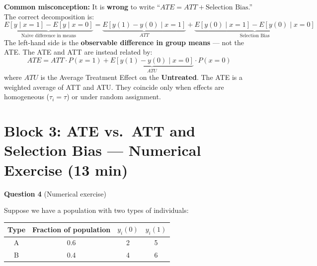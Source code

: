 \documentclass[11pt,a4paper]{article}
\begin{document}
\begin{enumerate}[label=(\alph*)]
\begin{solution}
\medskip
\textbf{Common misconception:} It is \textbf{wrong} to write ``$ATE = ATT + \text{Selection Bias}$.'' The correct decomposition is:
\[
  \underbrace{E[y \mid x{=}1] - E[y \mid x{=}0]}_{\text{Naive difference in means}} = \underbrace{E[y(1) - y(0) \mid x{=}1]}_{ATT} + \underbrace{E[y(0) \mid x{=}1] - E[y(0) \mid x{=}0]}_{\text{Selection Bias}}
\]
The left-hand side is the \textbf{observable difference in group means} --- not the ATE. The ATE and ATT are instead related by:
\[
  ATE = ATT \cdot P(x{=}1) + \underbrace{E[y(1) - y(0) \mid x{=}0]}_{ATU} \cdot P(x{=}0)
\]
where $ATU$ is the Average Treatment Effect on the \textbf{Untreated}. The ATE is a weighted average of ATT and ATU. They coincide only when effects are homogeneous ($\tau_i = \tau$) or under random assignment.
\end{solution}
\end{enumerate}

\section{Block 3: ATE vs.\ ATT and Selection Bias --- Numerical Exercise \textnormal{(13 min)}}

\textbf{Question 4} (Numerical exercise)

\medskip
Suppose we have a population with two types of individuals:

\begin{center}
\begin{tabular}{cccc}
\toprule
Type & Fraction of population & $y_i(0)$ & $y_i(1)$ \\
\midrule
A & 0.6 & 2 & 5 \\
B & 0.4 & 4 & 6 \\
\bottomrule
\end{tabular}
\end{center}
\end{document}
